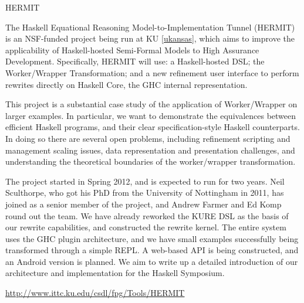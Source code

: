 \begin{hcarentry}{HERMIT}
\label{HERMIT}
\makeheader

The Haskell Equational Reasoning Model-to-Implementation Tunnel
(HERMIT) is an NSF-funded project being run at KU \cref{ukansas}, which aims to improve the
applicability of Haskell-hosted Semi-Formal Models to High Assurance Development.
Specifically, HERMIT will use: a Haskell-hosted DSL; the Worker/Wrapper Transformation;
and a new refinement user interface to perform rewrites directly on Haskell Core, the GHC internal representation.

This project is a substantial case study of the application of
Worker/Wrapper on larger examples. In particular, we want to
demonstrate the equivalences between efficient Haskell programs, and
their clear specification-style Haskell counterparts. In doing so
there are several open problems, including refinement scripting and
management scaling issues, data representation and presentation
challenges, and understanding the theoretical boundaries of the
worker/wrapper transformation.

The project started in Spring 2012, and is expected to run for two years.
Neil Sculthorpe, who got his PhD from the University of Nottingham in 2011, has joined as a senior member of the project,
and Andrew Farmer and Ed Komp round out the team.
We have already reworked the KURE DSL as the basis of our rewrite capabilities, and constructed the rewrite kernel.
The entire system uses the GHC plugin architecture,
and we have small examples successfully being transformed through a simple REPL.
A web-based API is being constructed, and an Android version is planned.
We aim to write up a detailed introduction of our architecture
and implementation for the Haskell Symposium.

\FurtherReading
  \url{http://www.ittc.ku.edu/csdl/fpg/Tools/HERMIT}
\end{hcarentry}
